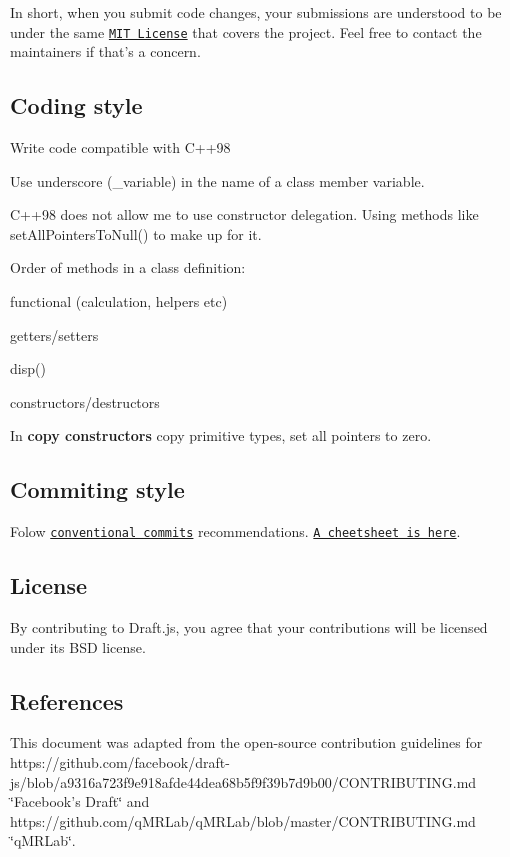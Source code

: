 In short, when you submit code changes, your submissions are understood to be under the same \href{http://choosealicense.com/licenses/mit/}{\tt M\-I\-T License} that covers the project. Feel free to contact the maintainers if that's a concern.

\subsection*{Coding style}


\begin{DoxyItemize}
\item Write code compatible with C++98
\item Use underscore ({\ttfamily \-\_\-variable}) in the name of a class member variable.
\item C++98 does not allow me to use constructor delegation. Using methods like {\ttfamily set\-All\-Pointers\-To\-Null()} to make up for it.
\item Order of methods in a class definition\-:
\begin{DoxyItemize}
\item functional (calculation, helpers etc)
\item getters/setters
\item disp()
\item constructors/destructors
\end{DoxyItemize}
\item In {\bfseries copy constructors} copy primitive types, set all pointers to zero.
\end{DoxyItemize}

\subsection*{Commiting style}


\begin{DoxyItemize}
\item Folow \href{https://www.conventionalcommits.org/en/v1.0.0/}{\tt conventional commits} recommendations. \href{https://www.cheatography.com/albelop/cheat-sheets/conventional-commits/pdf/}{\tt A cheetsheet is here}.
\end{DoxyItemize}

\subsection*{License}

By contributing to Draft.\-js, you agree that your contributions will be licensed under its B\-S\-D license.

\subsection*{References}

This document was adapted from the open-\/source contribution guidelines for https\-://github.com/facebook/draft-\/js/blob/a9316a723f9e918afde44dea68b5f9f39b7d9b00/\-C\-O\-N\-T\-R\-I\-B\-U\-T\-I\-N\-G.\-md \char`\"{}\-Facebook's Draft\char`\"{} and https\-://github.com/q\-M\-R\-Lab/q\-M\-R\-Lab/blob/master/\-C\-O\-N\-T\-R\-I\-B\-U\-T\-I\-N\-G.\-md \char`\"{}q\-M\-R\-Lab\char`\"{}. 